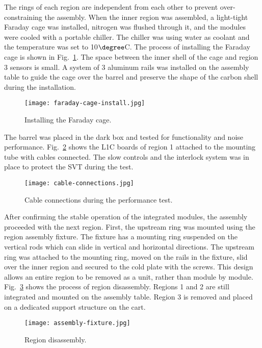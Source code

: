 The rings of each region are independent from each other to prevent over-constraining the assembly. When the inner region was assembled, a light-tight Faraday cage was installed, nitrogen was flushed through it, and the modules were cooled with a portable chiller. The chiller was using water as coolant and the temperature was set to 10$\degree$C. The process of installing the Faraday cage is shown in Fig.~\ref{fig:faraday-cage-install}. The space between the inner shell of the cage and region 3 sensors is small. A system of 3 aluminum rails was installed on the assembly table to guide the cage over the barrel and preserve the shape of the carbon shell during the installation. 

\begin{figure}[hbt] 
\centering 
\texttt{[image: faraday-cage-install.jpg]}
\caption{Installing the Faraday cage.}
\label{fig:faraday-cage-install}
\end{figure}

The barrel was placed in the dark box and tested for functionality and noise performance. Fig.~\ref{fig:cable-connections} shows the L1C boards of region 1 attached to the mounting tube with cables connected. The slow controls and the interlock system was in place to protect the SVT during the test.

\begin{figure}[hbt] 
\centering 
\texttt{[image: cable-connections.jpg]}
\caption{Cable connections during the performance test.}
\label{fig:cable-connections}
\end{figure}
 
After confirming the stable operation of the integrated modules, the assembly proceeded with the next region. First, the upstream ring was mounted using the region assembly fixture. The fixture has a mounting ring suspended on the vertical rods which can slide in vertical and horizontal directions. The upstream ring was attached to the mounting ring, moved on the rails in the fixture, slid over the inner region and secured to the cold plate with the screws. This design allows an entire region to be removed as a unit, rather than module by module. Fig.~\ref{fig:assembly-fixture} shows the process of region disassembly. Regions 1 and 2 are still integrated and mounted on the assembly table. Region 3 is removed and placed on a dedicated support structure on the cart.

\begin{figure}[hbt] 
\centering 
\texttt{[image: assembly-fixture.jpg]}
\caption{Region disassembly.}
\label{fig:assembly-fixture}
\end{figure}

